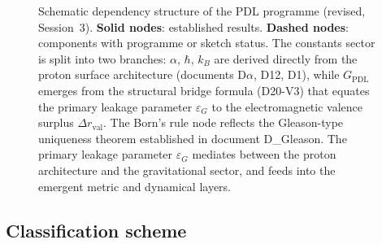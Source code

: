 \documentclass[11pt,a4paper]{article}
\begin{document}
\begin{figure}[H]

  \caption{Schematic dependency structure of the PDL programme
    (revised, Session~3).
    \textbf{Solid nodes}: established results.
    \textbf{Dashed nodes}: components with programme or sketch status.
    The constants sector is split into two branches:
    $\alpha$, $\hbar$, $k_B$ are derived directly from the proton surface
    architecture (documents D$\alpha$, D12, D1),
    while $G_{\mathrm{PDL}}$ emerges from the structural bridge formula
    (D20-V3) that equates the primary leakage parameter $\varepsilon_G$
    to the electromagnetic valence surplus $\Delta r_{\mathrm{val}}$.
    The Born's rule node reflects the Gleason-type uniqueness theorem
    established in document D\_Gleason.
    The primary leakage parameter $\varepsilon_G$ mediates between
    the proton architecture and the gravitational sector,
    and feeds into the emergent metric and dynamical layers.}
  \label{fig:pdl_dependency}
\end{figure}

\subsection{Classification scheme}
\label{subsec:classification_scheme}
\end{document}
